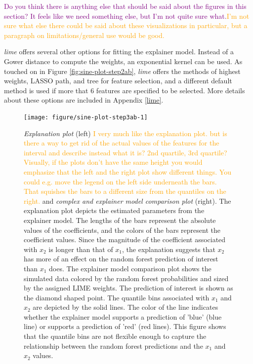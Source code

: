 \documentclass[AMS,STIX2COL]{WileyNJD-v2}\usepackage[]{graphicx}\usepackage[]{color}
\newenvironment{knitrout}{}{} %
\newcommand{\hh}[1]{\textcolor{orange}{#1}}
\newcommand{\kgc}[1]{\textcolor{purple}{#1}}
\begin{document}
{\kgc{Do you think there is anything else that should be said about the figures in this section? It feels like we need something else, but I'm not quite sure what.}\hh{I'm not sure what else there could be said about these visualizations in particular, but a paragraph on limitations/general use would be good.}

\emph{lime} offers several other options for fitting the explainer model. Instead of a Gower distance to compute the weights, an exponential kernel can be used. As touched on in Figure \ref{fig:sine-plot-step2ab}, \emph{lime} offers the methods of highest weights, LASSO path, and tree for feature selection, and a different default method is used if more that 6 features are specified to be selected. More details about these options are included in Appendix \ref{lime}.

\begin{figure}[!htp]
\begin{knitrout}
\color{fgcolor}
\texttt{[image: figure/sine-plot-step3ab-1]} 

\end{knitrout}
\caption{\emph{Explanation plot} (left) \hh{I very much like the explanation plot. but is there a way to get rid of the actual values of the features for the interval and describe instead what it is? 2nd quartile, 3rd quartile? Visually, if the plots don't have the same height you would emphasize that the left and the right plot show different things. You could e.g. move the legend on the left side underneath the bars. That squishes the bars to a different size from the quantiles on the right.} and \emph{complex and explainer model comparison plot} (right). The explanation plot depicts the estimated parameters from the explainer model. The lengths of the bars represent the absolute values of the coefficients, and the colors of the bars represent the coefficient values. Since the magnitude of the coefficient associated with $x_2$ is longer than that of $x_1$, the explanation suggests that $x_2$ has more of an effect on the random forest prediction of interest than $x_1$ does. The explainer model comparison plot shows the simulated data colored by the random forest probabilities and sized by the assigned LIME weights. The prediction of interest is shown as the diamond shaped point. The quantile bins associated with $x_1$ and $x_2$ are depicted by the solid lines. The color of the line indicates whether the explainer model supports a prediction of 'blue' (blue line) or supports a prediction of 'red' (red lines). This figure shows that the quantile bins are not flexible enough to capture the relationship between the random forest predictions and the $x_1$ and $x_2$ values.}
\label{fig:sine-plot-step3ab}
\end{figure}

}
\end{document}
